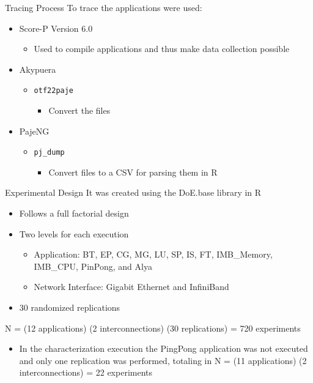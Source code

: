 \documentclass{beamer}
\begin{document}
\begin{frame}{Tracing Process}
To trace the applications were used:
\pause \vfill
    \begin{itemize}
        \item Score-P Version 6.0
        \begin{itemize}
            \item Used to compile applications and thus make data collection possible
        \end{itemize}
    \pause \vfill
        \item Akypuera
        \begin{itemize}
            \item \texttt{otf22paje}
                \begin{itemize}
                    \item Convert the files
                \end{itemize}
        \end{itemize}
    \pause \vfill
        \item PajeNG
        \begin{itemize}
            \item \texttt{pj\_dump}
                \begin{itemize}
                    \item Convert files to a CSV for parsing them in R
                \end{itemize}
        \end{itemize}
    \end{itemize}
\end{frame}


\begin{frame}{Experimental Design}
It was created using the DoE.base library in R
\begin{itemize}
    \item Follows a full factorial design
    \item Two levels for each execution
 \begin{itemize}
\item Application: \alert{BT}, \alert{EP}, \alert{CG}, \alert{MG}, \alert{LU}, \alert{SP}, \alert{IS}, \alert{FT}, \alert{IMB\_Memory}, \alert{IMB\_CPU}, \alert{PinPong}, and \alert{Alya}
\item Network Interface: \alert{Gigabit Ethernet} and \alert{InfiniBand}
\end{itemize}
    \item 30 randomized replications
   \end{itemize}
N = (12 applications) \texttimes{} (2 interconnections) \texttimes{} (30 replications) = 720 experiments
\pause \begin{itemize}
    \item In the characterization execution the PingPong application was not executed and only one replication was performed, totaling in N = (11 applications) \texttimes{} (2 interconnections) = 22 experiments  

\end{itemize}
\end{frame}
\end{document}
